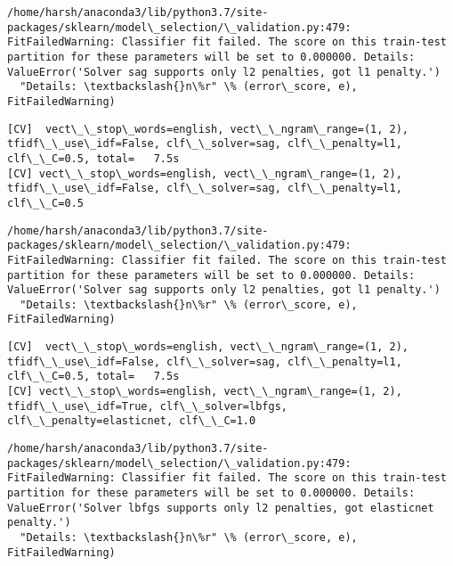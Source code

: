 \documentclass[11pt]{article}
\begin{document}
    \begin{Verbatim}[commandchars=\\\{\}]
/home/harsh/anaconda3/lib/python3.7/site-packages/sklearn/model\_selection/\_validation.py:479: FitFailedWarning: Classifier fit failed. The score on this train-test partition for these parameters will be set to 0.000000. Details: 
ValueError('Solver sag supports only l2 penalties, got l1 penalty.')
  "Details: \textbackslash{}n\%r" \% (error\_score, e), FitFailedWarning)

    \end{Verbatim}

    \begin{Verbatim}[commandchars=\\\{\}]
[CV]  vect\_\_stop\_words=english, vect\_\_ngram\_range=(1, 2), tfidf\_\_use\_idf=False, clf\_\_solver=sag, clf\_\_penalty=l1, clf\_\_C=0.5, total=   7.5s
[CV] vect\_\_stop\_words=english, vect\_\_ngram\_range=(1, 2), tfidf\_\_use\_idf=False, clf\_\_solver=sag, clf\_\_penalty=l1, clf\_\_C=0.5 

    \end{Verbatim}

    \begin{Verbatim}[commandchars=\\\{\}]
/home/harsh/anaconda3/lib/python3.7/site-packages/sklearn/model\_selection/\_validation.py:479: FitFailedWarning: Classifier fit failed. The score on this train-test partition for these parameters will be set to 0.000000. Details: 
ValueError('Solver sag supports only l2 penalties, got l1 penalty.')
  "Details: \textbackslash{}n\%r" \% (error\_score, e), FitFailedWarning)

    \end{Verbatim}

    \begin{Verbatim}[commandchars=\\\{\}]
[CV]  vect\_\_stop\_words=english, vect\_\_ngram\_range=(1, 2), tfidf\_\_use\_idf=False, clf\_\_solver=sag, clf\_\_penalty=l1, clf\_\_C=0.5, total=   7.5s
[CV] vect\_\_stop\_words=english, vect\_\_ngram\_range=(1, 2), tfidf\_\_use\_idf=True, clf\_\_solver=lbfgs, clf\_\_penalty=elasticnet, clf\_\_C=1.0 

    \end{Verbatim}

    \begin{Verbatim}[commandchars=\\\{\}]
/home/harsh/anaconda3/lib/python3.7/site-packages/sklearn/model\_selection/\_validation.py:479: FitFailedWarning: Classifier fit failed. The score on this train-test partition for these parameters will be set to 0.000000. Details: 
ValueError('Solver lbfgs supports only l2 penalties, got elasticnet penalty.')
  "Details: \textbackslash{}n\%r" \% (error\_score, e), FitFailedWarning)

    \end{Verbatim}
\end{document}
